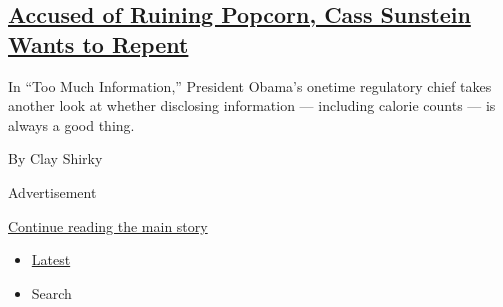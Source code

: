 \begin{enumerate}
  \hypertarget{accused-of-ruining-popcorn-cass-sunstein-wants-to-repent}{%
  \subsection{\texorpdfstring{\href{/2020/09/10/books/review/too-much-information-cass-sunstein.html}{Accused
  of Ruining Popcorn, Cass Sunstein Wants to
  Repent}}{Accused of Ruining Popcorn, Cass Sunstein Wants to Repent}}\label{accused-of-ruining-popcorn-cass-sunstein-wants-to-repent}}

  In ``Too Much Information,'' President Obama's onetime regulatory
  chief takes another look at whether disclosing information ---
  including calorie counts --- is always a good thing.

  By Clay Shirky
\end{enumerate}

Advertisement

\protect\hyperlink{after-mid1}{Continue reading the main story}

\begin{itemize}
\tightlist
\item
  \protect\hyperlink{stream-panel}{Latest}
\item
  Search
\end{itemize}

